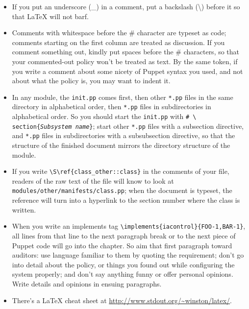 \begin{itemize}

\item If you put an underscore (\_) in a comment, put a backslash
(\textbackslash) before it so that {\LaTeX} will not barf.

\item Comments with whitespace before the \# character are typeset as
  code; comments starting on the first column are treated as
  discussion. If you comment something out, kindly put spaces before
  the \# characters, so that your commented-out policy won't be
  treated as text. By the same token, if you write a comment about
  some nicety of Puppet syntax you used, and not about what the policy
  is, you may want to indent it.

\item In any module, the \verb!init.pp! comes first, then other
\verb!*.pp! files in the same directory in alphabetical order, then
\verb!*.pp! files in subdirectories in alphabetical order. So you should
start the \verb!init.pp! with {\tt \# \textbackslash
section\{\emph{Subsystem name}\}}; start other \verb!*.pp! files with a
subsection directive, and \verb!*.pp! files in subdirectories with a
subsubsection directive, so that the structure of the finished document
mirrors the directory structure of the module.

\item If you write \verb!\S\ref{class_other::class}! in the comments
  of your file, readers of the raw text of the file will know to look
  at \verb!modules/other/manifests/class.pp!; when the document is
  typeset, the reference will turn into a hyperlink to the section
  number where the class is written.

\item When you write an implements tag
  \verb!\implements{iacontrol}{FOO-1,BAR-1}!, all lines from that line
  to the next paragraph break or to the next piece of Puppet code will
  go into the  chapter. So aim that
  first paragraph toward auditors: use language familiar to them by
  quoting the requirement; don't go into detail about the policy, or
  things you found out while configuring the system properly; and
  don't say anything funny or offer personal opinions. Write details
  and opinions in ensuing paragraphs.

\item There's a {\LaTeX} cheat sheet at
\url{http://www.stdout.org/~winston/latex/}.


\end{itemize}
